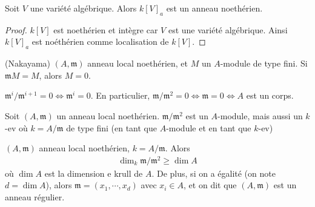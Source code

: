             \begin{coro}
                Soit $V$ une variété algébrique. Alors $k[V]_a$ est un anneau noethérien.
            \end{coro}
            \begin{proof}
                $k[V]$ est noethérien et intègre car $V$ est une variété algébrique. Ainsi $k[V]_a$ est noéthérien comme localisation de $k[V]$.
            \end{proof}
            \begin{lemm} (Nakayama)
                $(A, \mathfrak{m})$ anneau local noethérien, et $M$ un $A$-module de type fini. Si $\mathfrak{m} M = M$, alors $M = 0$.
            \end{lemm}
            \begin{coro}
                $\mathfrak{m}^i/ \mathfrak{m}^{i+1} = 0 \iff \mathfrak{m}^i = 0$. En particulier, $\mathfrak{m}/\mathfrak{m}^2 = 0 \iff \mathfrak{m} = 0 \iff A$ est un corps.
            \end{coro}
            \begin{remq}
                Soit $(A, \mathfrak{m})$ un anneau local noethérien. $\mathfrak{m}/\mathfrak{m}^2$ est un $A$-module, mais aussi un $k$-ev où $k = A/\mathfrak{m}$ de type fini (en tant que $A$-module et en tant que $k$-ev)
            \end{remq}
            \begin{theo}
                $(A, \mathfrak{m})$ anneau local noethérien, $k = A/\mathfrak{m}$. Alors
                \begin{align*}
                    \dim_k \mathfrak{m}/\mathfrak{m}^2 \geq \dim A
                \end{align*}
                où $\dim A$ est la dimension e krull de $A$. De plus, si on a égalité (on note $d = \dim A$), alors $\mathfrak{m} = (x_1, \cdots ,x_d)$ avec $x_i \in A$, et on dit que $(A, \mathfrak{m})$ est un anneau régulier.
            \end{theo}
        
